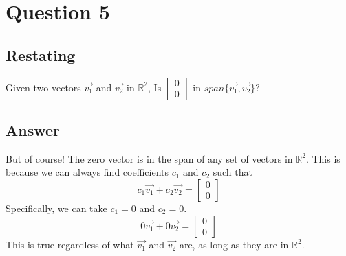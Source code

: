 \documentclass{article}
\begin{document}
    \section{Question 5}
        \subsection{Restating}
            Given two vectors $\vec{v_1}$ and $\vec{v_2}$ in $\mathbb{R}^2$,
            Is $\begin{bmatrix}0 \\ 0\end{bmatrix}$ in $span\{\vec{v_1}, \vec{v_2}\}$?
        \subsection{Answer}
            But of course! The zero vector is in the span of any set of vectors in $\mathbb{R}^2$.
            This is because we can always find coefficients $c_1$ and $c_2$ such that
            \[c_1\vec{v_1} + c_2\vec{v_2} = \begin{bmatrix}0 \\ 0\end{bmatrix}\]
            Specifically, we can take $c_1 = 0$ and $c_2 = 0$.
            \[0\vec{v_1} + 0\vec{v_2} = \begin{bmatrix}0 \\ 0\end{bmatrix}\]
            This is true regardless of what $\vec{v_1}$ and $\vec{v_2}$ are, as long as they are in $\mathbb{R}^2$.

\clearpage


\end{document}
